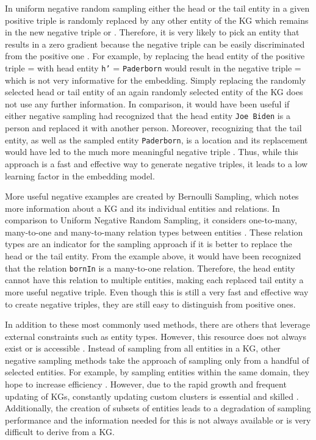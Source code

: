 In uniform negative random sampling either the head or the tail entity in a given positive triple  is randomly replaced by any other entity of the \ac{KG} which remains in the new negative triple  or . 
Therefore, it is very likely to pick an entity that results in a zero gradient because the negative triple can be easily discriminated from the positive one \cite{cai2017kbgan}.
For example, by replacing the head entity of the positive triple  =  with head entity \texttt{h'} = \texttt{Paderborn} would result in the negative triple  =   which is not very informative for the embedding.
Simply replacing the randomly selected head or tail entity of an again randomly selected entity of the \ac{KG} does not use any further information.
In comparison, it would have been useful if either negative sampling had recognized that the head entity \texttt{Joe Biden} is a person and replaced it with another person.
Moreover, recognizing that the tail entity, as well as the sampled entity \texttt{Paderborn}, is a location and its replacement would have led to the much more meaningful negative triple .  
Thus, while this approach is a fast and effective way to generate negative triples, it leads to a low learning factor in the embedding model.

More useful negative examples are created by Bernoulli Sampling, which notes more information about a \ac{KG} and its individual entities and relations.
In comparison to Uniform Negative Random Sampling, it considers one-to-many, many-to-one and many-to-many relation types between entities \cite{zhang2021efficient}.
These relation types are an indicator for the sampling approach if it is better to replace the head or the tail entity.
From the example above, it would have been recognized that the relation \texttt{bornIn} is a many-to-one relation.
Therefore, the head entity cannot have this relation to multiple entities, making each replaced tail entity a more useful negative triple.
Even though this is still a very fast and effective way to create negative triples, they are still easy to distinguish from positive ones.

In addition to these most commonly used methods, there are others that leverage external constraints such as entity types.
However, this resource does not always exist or is accessible \cite{cai2017kbgan}.
Instead of sampling from all entities in a \ac{KG}, other negative sampling methods take the approach of sampling only from a handful of selected entities.
For example, by sampling entities within the same domain, they hope to increase efficiency \cite{qiannegative}.
However, due to the rapid growth and frequent updating of \acp{KG}, constantly updating custom clusters is essential and skilled \cite{qiannegative}. 
Additionally, the creation of subsets of entities leads to a degradation of sampling performance and the information needed for this is not always available or is very difficult to derive from a \ac{KG}.


